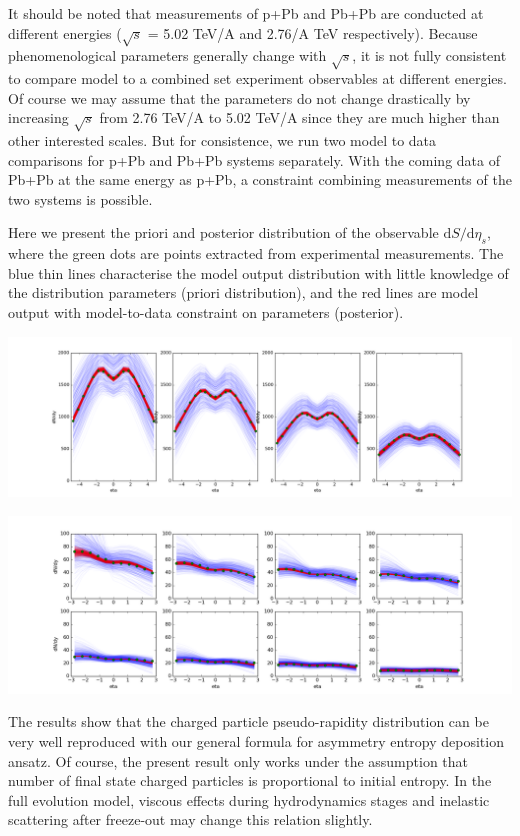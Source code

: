 \documentclass[aps,prl,twocolumn,groupedaddress]{revtex4-1}
\begin{document}
	It should be noted that measurements of p+Pb and Pb+Pb are conducted at different energies ($\sqrt{s}$ = 5.02 TeV/A and 2.76/A TeV respectively). 
	Because phenomenological parameters generally change with $\sqrt{s}$, it is not fully consistent to compare model to a combined set experiment observables at different energies.
	Of course we may assume that the parameters do not change drastically by increasing $\sqrt{s}$ from 2.76 TeV/A to 5.02 TeV/A since they are much higher than other interested scales.
	But for consistence, we run two model to data comparisons for p+Pb and Pb+Pb systems separately.
	With the coming data of Pb+Pb at the same energy as p+Pb, a  constraint combining measurements of the two systems is possible.
	
	Here we present the priori and posterior distribution of the observable $\mathrm{d}S/\mathrm{d}\eta_s$, where the green dots are points extracted from experimental measurements. 
	The blue thin lines characterise the model output distribution with little knowledge of the distribution parameters (priori distribution), and the red lines are model output with model-to-data constraint on parameters (posterior).
	
	\includegraphics[width=\columnwidth]{pics/pri-post-PbPb.png}
	
	\includegraphics[width=\columnwidth]{pics/pri-post-pPb.png}

	The results show that the charged particle pseudo-rapidity distribution can be very well reproduced with our general formula for asymmetry entropy deposition ansatz.
	Of course, the present result only works under the assumption that number of final state charged particles is proportional to initial entropy. 
	In the full evolution model, viscous effects during hydrodynamics stages and inelastic scattering after freeze-out may change this relation slightly.
	 
\end{document}
